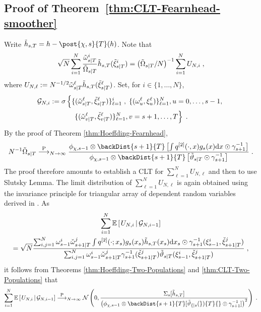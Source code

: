 \subsection{Proof of Theorem~\ref{thm:CLT-Fearnhead-smoother}}
\label{proof:thm:CLT-Fearnhead-smoother}
Write $\tilde{h}_{s,T} =  h - \post{\Xinit,s}{T}(h)$. Note that
\[
\sqrt{N}\sum_{i=1}^N \frac{\tilde{\omega}_{s|T}^{i}}{\tilde{\Omega}_{s|T}} \tilde{h}_{s,T}(\tilde{\xi}_{s|T}^{i}) = \left(\tilde{\Omega}_{s|T}/N\right)^{-1}\sum_{i=1}^N U_{N,i}\;,
\]
where $U_{N,\ell} := N^{-1/2} \tilde{\omega}_{s|T}^{\ell} \tilde{h}_{s,T}(\tilde{\xi}_{s|T}^{\ell})$. Set, for $i \in \{1, \dots, N\}$,
\begin{multline*}
\mcg{N,i} \eqdef \sigma\left\{ \{ (\smwght{s}{T}{\ell},\smpart{s}{T}{\ell}) \}_{\ell=1}^i \eqsp,\eqsp\{ (\ewght{u}{\ell}, \epart{u}{\ell}) \}_{\ell=1}^N, u =0, \dots, s-1,\right.\\
\left. \{ (\ebackwght{v}{T}{\ell},\ebackpart{v}{T}{\ell}) \}_{\ell=1}^N, v =s+1, \dots, T\right\} \eqsp.
\end{multline*}
By the proof of Theorem \ref{thm:Hoeffding-Fearnhead},
\[
N^{-1} \tilde{\Omega}_{s|T} \plim_{N \to \infty}
\frac{\filt{\Xinit,s-1} \otimes \backDist{s+1}{T} \left[ \int q^{[2]}(\cdot,x) g_s(x) \rmd x \odot \fakeprior_{s+1}^{-1}\right]}
{\filt{\Xinit,s-1} \otimes \backDist{s+1}{T} \left[ \adjfunc[smooth]{s}{T}{} \odot \fakeprior_{s+1}^{-1} \right]} \eqsp.
\]
The proof therefore amounts to establish a CLT for $\sum_{\ell=1}^N U_{N,\ell}$ and then to use Slutsky Lemma.
The limit distribution of $\sum_{\ell=1}^N U_{N,\ell}$ is again obtained using  the invariance principle for triangular array of dependent random variables derived in \cite{douc:moulines:2008}. As
\begin{multline*}
\sum_{i=1}^N \CPE{U_{N,i}}{\mcg{N,i-1}}\\
 = \sqrt{N} \frac{\sum_{i,j=1}^N \ewght{s-1}{i} \ebackwght{s+1}{T}{j} \int q^{[2]}(\cdot; x_s) g_s(x_s) \tilde{h}_{s,T}(x_s)\rmd x_s\odot \fakeprior_{s+1}^{-1}(\epart{s-1}{i},\ebackpart{s+1}{T}{j}) }
{\sum_{i,j=1}^N \ewght{s-1}{i} \ebackwght{s+1}{T}{j} \fakeprior_{s+1}^{-1}(\ebackpart{s+1}{T}{j}) \adjfunc[smooth]{s}{T}{\epart{s-1}{i},\ebackpart{s+1}{T}{j}}}\eqsp,
\end{multline*}
it follows from Theorems \ref{thm:Hoeffding-Two-Populations} and \ref{thm:CLT-Two-Populations} that
\[
\sum_{i=1}^N \CPE{U_{N,i}}{\mcg{N,i-1}} \plim_{N \to \infty} \mathcal{N}\left(0, \frac{\Sigma_s[\tilde{h}_{s,T}]}{\left(\filt{\Xinit,s-1} \otimes \backDist{s+1}{T} [\adjfunc[smooth]{s}{T}{}\odot\gamma_{s+1}^{-1}] \right)^2} \right) \eqsp.
\]
